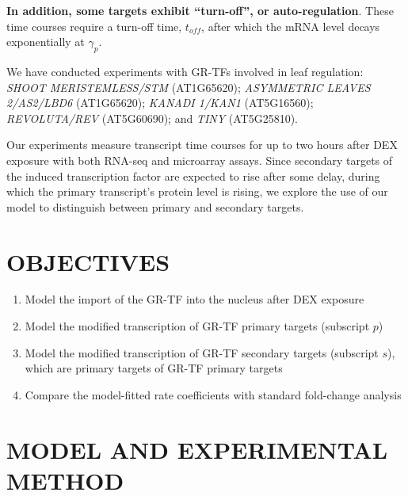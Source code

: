 \documentclass[aspb,landscape]{a0poster}
\begin{document}
\begin{multicols}{4}
  \textbf{In addition, some targets exhibit ``turn-off'', or auto-regulation}. These time courses require a turn-off time, $t_{off}$, after which the mRNA level decays exponentially at $\gamma_p$.
  
  We have conducted experiments with GR-TFs involved in leaf regulation: 
  \textit{SHOOT MERISTEMLESS/STM} (AT1G65620);
  \textit{ASYMMETRIC LEAVES 2/AS2/LBD6} (AT1G65620);
  \textit{KANADI 1/KAN1} (AT5G16560); 
  \textit{REVOLUTA/REV} (AT5G60690); and 
  \textit{TINY} (AT5G25810).
  
  Our experiments measure transcript time courses for up to two hours after DEX exposure with both RNA-seq and microarray assays.
  Since secondary targets of the induced transcription factor are expected to rise after some delay, during which the primary transcript's protein level is rising,
  we explore the use of our model to distinguish between primary and secondary targets.
  

  \section*{OBJECTIVES}
  \color{CarnegiePriBlue}  

  \begin{enumerate}
  \item Model the import of the GR-TF into the nucleus after DEX exposure
  \item Model the modified transcription of GR-TF primary targets (subscript $p$)
  \item Model the modified transcription of GR-TF secondary targets (subscript $s$), which are primary targets of GR-TF primary targets
  \item Compare the model-fitted rate coefficients with standard fold-change analysis
  \end{enumerate}

  \color{Black}


  \section*{MODEL AND EXPERIMENTAL METHOD}


\end{multicols}
\end{document}
